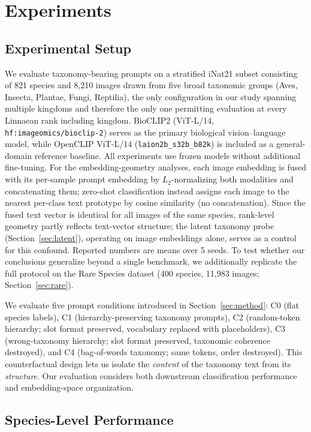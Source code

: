 \section{Experiments}

\subsection{Experimental Setup}

We evaluate taxonomy-bearing prompts on a stratified iNat21 subset consisting of
821 species and 8{,}210 images drawn from five broad taxonomic groups (Aves,
Insecta, Plantae, Fungi, Reptilia), the only configuration in our study spanning multiple kingdoms
and therefore the only one permitting evaluation at every Linnaean rank including
kingdom. BioCLIP2 (ViT-L/14, \texttt{hf:imageomics/bioclip-2}) serves as the
primary biological vision--language model, while OpenCLIP ViT-L/14
(\texttt{laion2b\_s32b\_b82k}) is included as a general-domain reference baseline.
All experiments use frozen models without additional fine-tuning. For the
embedding-geometry analyses, each image embedding is fused with its per-sample
prompt embedding by $L_2$-normalizing both modalities and concatenating them;
zero-shot classification instead assigns each image to the nearest per-class text
prototype by cosine similarity (no concatenation). Since the fused text vector is
identical for all images of the same species, rank-level geometry partly reflects
text-vector structure; the latent taxonomy probe (Section~\ref{sec:latent}),
operating on image embeddings alone, serves as a control for this confound.
Reported numbers are means over 5 seeds. To test whether our conclusions generalize
beyond a single benchmark, we additionally replicate the full protocol on the Rare
Species dataset (400 species, 11{,}983 images; Section~\ref{sec:rare}).

We evaluate five prompt conditions introduced in Section~\ref{sec:method}: C0 (flat species
labels), C1 (hierarchy-preserving taxonomy prompts), C2 (random-token hierarchy;
slot format preserved, vocabulary replaced with placeholders), C3 (wrong-taxonomy
hierarchy; slot format preserved, taxonomic coherence destroyed), and C4
(bag-of-words taxonomy; same tokens, order destroyed). This counterfactual design
lets us isolate the \emph{content} of the taxonomy text from its \emph{structure}.
Our evaluation considers both downstream classification performance and
embedding-space organization.

\subsection{Species-Level Performance}

